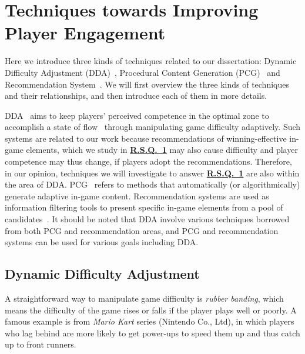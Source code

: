 \section{Techniques towards Improving Player Engagement}

Here we introduce three kinds of techniques related to our dissertation: Dynamic Difficulty Adjustment (DDA)~\citep{hunicke2005case}, Procedural Content Generation (PCG)~\citep{yannakakis2011experience,togelius2011search} and Recommendation System~\citep{medler2011using}. We will first overview the three kinds of techniques and their relationships, and then introduce each of them in more details.

DDA~\citep{hunicke2005case} aims to keep players' perceived competence in the optimal zone to accomplish a state of flow~\citep{flow1990psychology,sweetser2005gameflow,chen2007flow} through manipulating game difficulty adaptively. Such systems are related to our work  because recommendations of winning-effective in-game elements, which we study in \hyperref[rq1]{\textbf{R.S.Q.~1}} may also cause difficulty and player competence may thus change, if players adopt the recommendations. Therefore, in our opinion, techniques we will investigate to answer \hyperref[rq1]{\textbf{R.S.Q.~1}} are also within the area of DDA. PCG~\citep{yannakakis2011experience,togelius2011search} refers to methods that automatically (or algorithmically) generate adaptive in-game content. Recommendation systems are used as information filtering tools to  present specific in-game elements from a pool of candidates~\citep{medler2011using}.  It should be noted that DDA  involve various techniques borrowed from both PCG and recommendation areas, and PCG and recommendation systems can be used for various goals including DDA. 




\subsection{Dynamic Difficulty Adjustment}\label{sec:dda}

A straightforward way to manipulate game difficulty is \textit{rubber banding}, which means the difficulty of the game rises or falls if the player plays well or poorly. A famous example is from \textit{Mario Kart} series (Nintendo Co., Ltd), in which players who lag behind are more likely to get power-ups to speed them up and thus catch up to front runners. 

